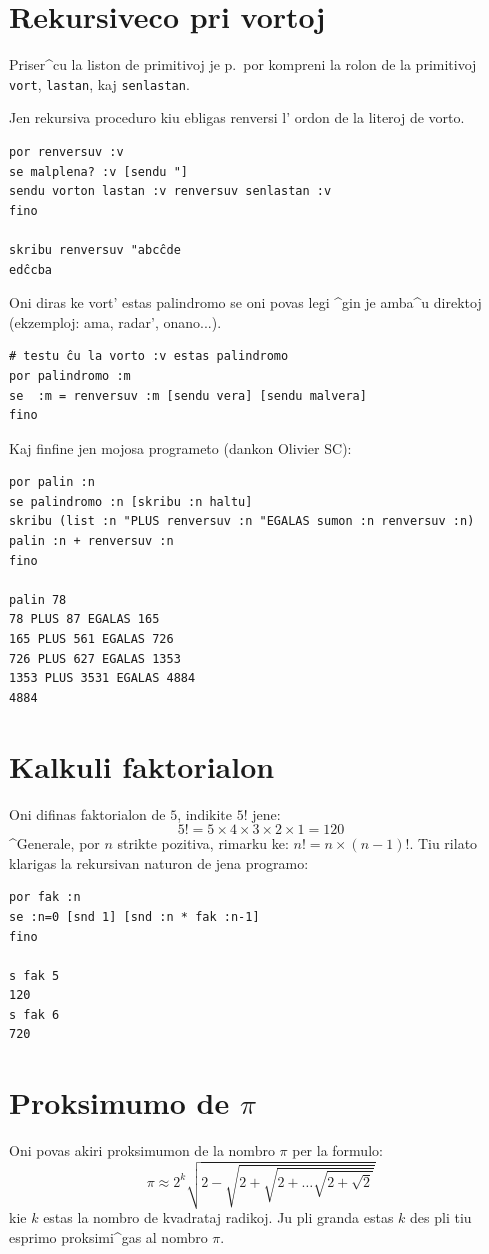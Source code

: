 \section{Rekursiveco pri vortoj}
Priser^cu la liston de primitivoj je p.\,\pageref{liste-prim} por
kompreni la rolon de la primitivoj \texttt{vort}, \texttt{lastan}, kaj
\texttt{senlastan}.

Jen rekursiva proceduro kiu ebligas renversi l' ordon de la literoj de
vorto.
\begin{verbatim}
por renversuv :v
se malplena? :v [sendu "]  
sendu vorton lastan :v renversuv senlastan :v
fino

skribu renversuv "abcĉde
edĉcba
\end{verbatim}
Oni diras ke vort' estas palindromo se oni povas legi ^gin je amba^u
direktoj (ekzemploj: ama, radar', onano...).
\begin{verbatim}
# testu ĉu la vorto :v estas palindromo
por palindromo :m
se  :m = renversuv :m [sendu vera] [sendu malvera] 
fino
\end{verbatim}
Kaj finfine jen mojosa programeto (dankon Olivier SC):
\begin{verbatim}
por palin :n
se palindromo :n [skribu :n haltu]
skribu (list :n "PLUS renversuv :n "EGALAS sumon :n renversuv :n)
palin :n + renversuv :n 
fino

palin 78
78 PLUS 87 EGALAS 165
165 PLUS 561 EGALAS 726
726 PLUS 627 EGALAS 1353
1353 PLUS 3531 EGALAS 4884
4884
\end{verbatim}
\section{Kalkuli faktorialon}
\label{factorielle}
Oni difinas faktorialon de $5$, indikite $5!$ jene:
 $$5!=5\times4\times3\times2\times1=120$$
^Generale, por $n$ strikte pozitiva, rimarku ke: $n!=n\times(n-1)!$.
Tiu rilato klarigas la rekursivan naturon de jena programo:
\begin{verbatim}
por fak :n
se :n=0 [snd 1] [snd :n * fak :n-1]
fino

s fak 5
120
s fak 6
720
\end{verbatim} 
 \section{Proksimumo de $\pi$}
\label{approx-pi}
Oni povas akiri proksimumon de la nombro $\pi$ per la formulo:
$$\pi\approx2^k\sqrt{2-\sqrt{2+\sqrt{2+\ldots\sqrt{2+\sqrt2}}}}$$ 
kie $k$ estas la nombro de kvadrataj radikoj.  Ju pli granda estas $k$
des pli tiu esprimo proksimi^gas al nombro $\pi$.

